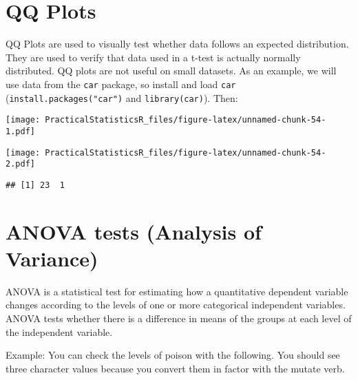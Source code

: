 \documentclass[
]{article}
\newenvironment{Shaded}{\begin{snugshade}}{\end{snugshade}}
\newcommand{\DataTypeTok}[1]{\textcolor[rgb]{0.13,0.29,0.53}{#1}}
\newcommand{\DecValTok}[1]{\textcolor[rgb]{0.00,0.00,0.81}{#1}}
\newcommand{\KeywordTok}[1]{\textcolor[rgb]{0.13,0.29,0.53}{\textbf{#1}}}
\newcommand{\NormalTok}[1]{#1}
\newcommand{\OperatorTok}[1]{\textcolor[rgb]{0.81,0.36,0.00}{\textbf{#1}}}
\newcommand{\OtherTok}[1]{\textcolor[rgb]{0.56,0.35,0.01}{#1}}
\newcommand{\StringTok}[1]{\textcolor[rgb]{0.31,0.60,0.02}{#1}}
\begin{document}
\hypertarget{qq-plots}{%
\section{QQ Plots}\label{qq-plots}}

QQ Plots are used to visually test whether data follows an expected
distribution. They are used to verify that data used in a t-test is
actually normally distributed. QQ plots are not useful on small
datasets. As an example, we will use data from the \texttt{car} package,
so install and load \texttt{car} (\texttt{install.packages("car")} and
\texttt{library(car)}). Then:

\begin{Shaded}
\end{Shaded}

\texttt{[image: PracticalStatisticsR\_files/figure-latex/unnamed-chunk-54-1.pdf]}

\begin{Shaded}
\end{Shaded}

\texttt{[image: PracticalStatisticsR\_files/figure-latex/unnamed-chunk-54-2.pdf]}

\begin{verbatim}
## [1] 23  1
\end{verbatim}

\hypertarget{anova-tests-analysis-of-variance}{%
\section{ANOVA tests (Analysis of
Variance)}\label{anova-tests-analysis-of-variance}}

ANOVA is a statistical test for estimating how a quantitative dependent
variable changes according to the levels of one or more categorical
independent variables. ANOVA tests whether there is a difference in
means of the groups at each level of the independent variable.

Example: You can check the levels of poison with the following. You
should see three character values because you convert them in factor
with the mutate verb.
\end{document}
